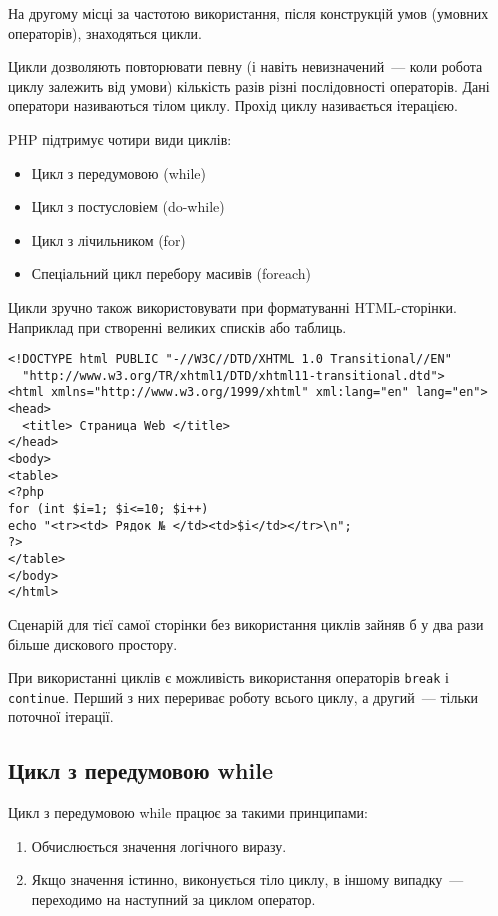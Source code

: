 
На другому місці за частотою використання, після конструкцій умов (умовних операторів), знаходяться цикли.

Цикли дозволяють повторювати певну (і навіть невизначений~--- коли робота циклу залежить від умови) кількість разів різні послідовності операторів. Дані оператори називаються тілом циклу. Прохід циклу називається ітерацією.

PHP підтримує чотири види циклів:
\begin{itemize}
\item    Цикл з передумовою (while)
\item    Цикл з постусловіем (do-while)
\item    Цикл з лічильником (for)
\item    Спеціальний цикл перебору масивів (foreach)
\end{itemize}

Цикли зручно також використовувати при форматуванні HTML-сторінки. Наприклад при створенні великих списків або таблиць.

\begin{lstlisting}[caption=Формування HTML-сторінки за допомогою циклів]
<!DOCTYPE html PUBLIC "-//W3C//DTD/XHTML 1.0 Transitional//EN"
  "http://www.w3.org/TR/xhtml1/DTD/xhtml11-transitional.dtd">
<html xmlns="http://www.w3.org/1999/xhtml" xml:lang="en" lang="en">
<head>
  <title> Страница Web </title>
</head>
<body>
<table>
<?php
for (int $i=1; $i<=10; $i++) 
echo "<tr><td> Рядок № </td><td>$i</td></tr>\n";
?>
</table>
</body>
</html>
\end{lstlisting}




Сценарій для тієї самої сторінки без використання циклів зайняв б у два рази більше дискового простору.

При використанні циклів є можливість використання операторів \verb'break' і \verb'continue'. Перший з них перериває роботу всього циклу, а другий~--- тільки поточної ітерації.


\subsection*{Цикл з передумовою while}
Цикл з передумовою while працює за такими принципами:

\begin{enumerate}
\item    Обчислюється значення логічного виразу.
\item    Якщо значення істинно, виконується тіло циклу, в іншому випадку~--- переходимо на наступний за циклом оператор.
\end{enumerate}



